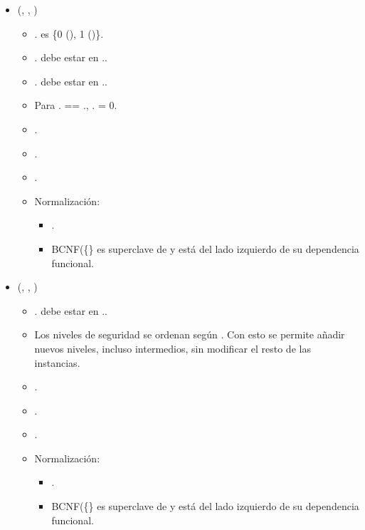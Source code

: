 \begin{itemize}
    \item {}(, ,
          )
          \begin{itemize}
              \item {}. es \{0
                    (), 1 ()\}.
              \item {}. debe estar en
                    ..
              \item {}. debe estar en
                    ..
              \item Para . == .,
                    . = 0.
              \item {}.
              \item {}.
              \item {}.
              \item Normalización:
                    \begin{itemize}
                        \item {}.
                        \item BCNF(\{\} es superclave de  y está del lado
                              izquierdo de su dependencia funcional.
                    \end{itemize}
          \end{itemize}

    \item {}(, , )
          \begin{itemize}
              \item {}. debe estar en
                    ..
              \item Los niveles de seguridad se ordenan según . Con esto se permite
                    añadir nuevos niveles, incluso intermedios, sin modificar el resto de las
                    instancias.
              \item {}.
              \item {}.
              \item \FK{$\emptyset$}.
              \item Normalización:
                    \begin{itemize}
                        \item {}.
                        \item BCNF(\{\} es superclave de  y está del lado
                              izquierdo de su dependencia funcional.
                    \end{itemize}
          \end{itemize}


\end{itemize}
